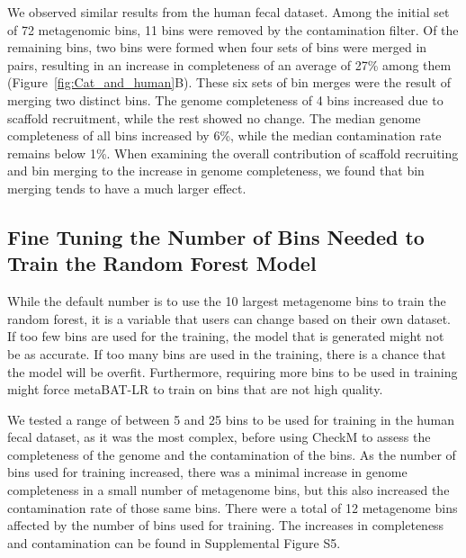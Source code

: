 \documentclass[fleqn,10pt,lineno]{wlpeerj}
\begin{document}
We observed similar results from the human fecal dataset. Among the initial set of 72 metagenomic bins, 11 bins were removed by the contamination filter. Of the remaining bins, two bins were formed when four sets of bins were merged in pairs, resulting in an increase in completeness of an average of 27\% among them (Figure~\ref{fig:Cat_and_human}B). These six sets of bin merges were the result of merging two distinct bins. The genome completeness of 4 bins increased due to scaffold recruitment, while the rest showed no change. The median genome completeness of all bins increased by 6\%, while the median contamination rate remains below 1\%. When examining the overall contribution of scaffold recruiting and bin merging to the increase in genome completeness, we found that bin merging tends to have a much larger effect.


\subsection*{Fine Tuning the Number of Bins Needed to Train the Random Forest Model}
While the default number is to use the 10 largest metagenome bins to train the random forest, it is a variable that users can change based on their own dataset. If too few bins are used for the training, the model that is generated might not be as accurate. If too many bins are used in the training, there is a chance that the model will be overfit. Furthermore, requiring more bins to be used in training might force metaBAT-LR to train on bins that are not high quality. 

We tested a range of between 5 and 25 bins to be used for training in the human fecal dataset, as it was the most complex, before using CheckM to assess the completeness of the genome and the contamination of the bins.  As the number of bins used for training increased, there was a minimal increase in genome completeness in a small number of metagenome bins, but this also increased the contamination rate of those same bins. There were a total of 12 metagenome bins affected by the number of bins used for training. The increases in completeness and contamination can be found in Supplemental Figure S5.     
\end{document}
